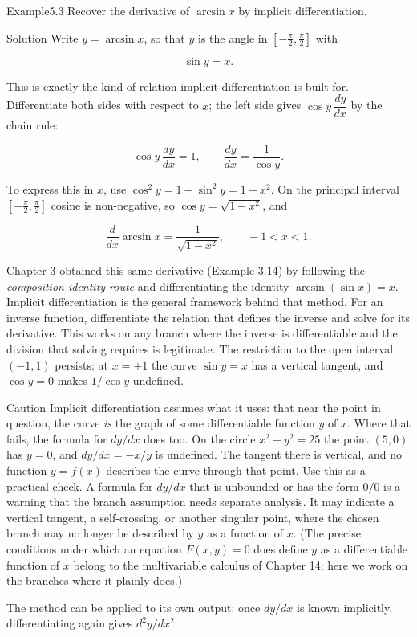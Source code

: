 \documentclass[a4paper,12pt,oneside]{memoir}
\begin{document}
\begin{workedexample}
\begin{envexample}{Example}{5.3}{}
Recover the derivative of \(\arcsin x\) by implicit differentiation.
\end{envexample}
\begin{envsolution}{Solution}{}{}
Write \(y = \arcsin x\), so that \(y\) is the angle in \([-\tfrac{\pi}{2}, \tfrac{\pi}{2}]\) with

\[ \sin y = x. \]

This is exactly the kind of relation implicit differentiation is built for. Differentiate both sides with respect to \(x\); the left side gives \(\cos y\,\dfrac{dy}{dx}\) by the chain rule:

\[ \cos y\,\frac{dy}{dx} = 1, \qquad \frac{dy}{dx} = \frac{1}{\cos y}. \]

To express this in \(x\), use \(\cos^{2} y = 1 - \sin^{2} y = 1 - x^{2}\). On the principal interval \([-\tfrac{\pi}{2}, \tfrac{\pi}{2}]\) cosine is non-negative, so \(\cos y = \sqrt{1 - x^{2}}\), and

\[ \frac{d}{dx}\arcsin x = \frac{1}{\sqrt{1 - x^{2}}}, \qquad -1 < x < 1. \]

Chapter 3 obtained this same derivative (Example 3.14) by following the \emph{composition-identity route} and differentiating the identity \(\arcsin(\sin x) = x\). Implicit differentiation is the general framework behind that method. For an inverse function, differentiate the relation that defines the inverse and solve for its derivative. This works on any branch where the inverse is differentiable and the division that solving requires is legitimate. The restriction to the open interval \((-1, 1)\) persists: at \(x = \pm 1\) the curve \(\sin y = x\) has a vertical tangent, and \(\cos y = 0\) makes \(1/\cos y\) undefined. \qedmark
\end{envsolution}
\end{workedexample}
\begin{envcaution}{Caution}{}{}
Implicit differentiation assumes what it uses: that near the point in question, the curve \emph{is} the graph of some differentiable function \(y\) of \(x\). Where that fails, the formula for \(dy/dx\) does too. On the circle \(x^{2} + y^{2} = 25\) the point \((5, 0)\) has \(y = 0\), and \(dy/dx = -x/y\) is undefined. The tangent there is vertical, and no function \(y = f(x)\) describes the curve through that point. Use this as a practical check. A formula for \(dy/dx\) that is unbounded or has the form \(0/0\) is a warning that the branch assumption needs separate analysis. It may indicate a vertical tangent, a self-crossing, or another singular point, where the chosen branch may no longer be described by \(y\) as a function of \(x\). (The precise conditions under which an equation \(F(x, y) = 0\) does define \(y\) as a differentiable function of \(x\) belong to the multivariable calculus of Chapter 14; here we work on the branches where it plainly does.)
\end{envcaution}
The method can be applied to its own output: once \(dy/dx\) is known implicitly, differentiating again gives \(d^{2}y/dx^{2}\).
\end{document}
